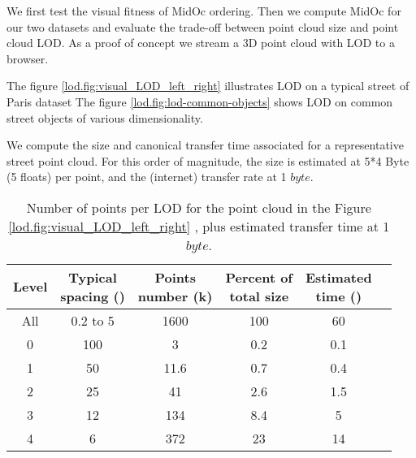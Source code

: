 		
		We first test the visual fitness of MidOc ordering.
		Then we compute MidOc for our two datasets and evaluate the trade-off between point cloud size and point cloud LOD. 
		As a proof of concept we stream a 3D point cloud with LOD to a browser.
		
		The figure \ref{lod.fig:visual_LOD_left_right} illustrates LOD on a typical street of Paris dataset
		The figure \ref{lod.fig:lod-common-objects} shows LOD on common street objects of various dimensionality.
			  
		We compute the size and canonical transfer time associated for a representative street point cloud.
		For this order of magnitude, the size is estimated at 5*4 Byte (5 floats) per point, and the (internet) transfer rate at 1 \mega $byte$\per \second.
		
		\begin{table}[ht]
			\centering
			\caption{Number of points per LOD for the point cloud in the Figure \ref{lod.fig:visual_LOD_left_right}
				, plus estimated transfer time at 1 \mega $byte$\per \second.}
			\label{lod.tab:lod-size-time}
			\scriptsize 
			\begin{tabular}{cccccc}
				\bf{Level} & \shortstack{\bf{Typical} \\ \bf{spacing (\centi \meter)}} & \shortstack{ \bf{Points} \\ \bf{number (k)}} & \shortstack{\bf{Percent of} \\ \bf{total size}} & \shortstack{\bf{Estimated} \\ \bf{time (\second)}}   \\
				\hline All & 0.2 to 5  & 1600 & 100 & 60 \\ 
				\hline 0 & 100 & 3 & 0.2 & 0.1 \\ 
				\hline 1 & 50 & 11.6 & 0.7 & 0.4 \\ 
				\hline 2 & 25 & 41 & 2.6 & 1.5 \\ 
				\hline 3 & 12 & 134 & 8.4 & 5 \\ 
				\hline 4 & 6 & 372 & 23 & 14 \\    
			\end{tabular} 
		\end{table}
			 
